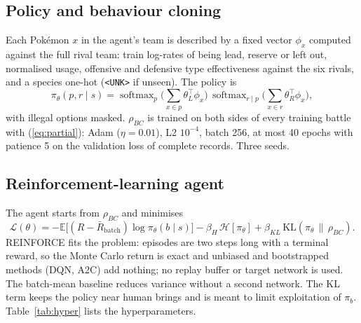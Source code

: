 \documentclass[conference]{IEEEtran}
\begin{document}
\subsection{Policy and behaviour cloning}
Each Pok\'emon $x$ in the agent's team is described by a fixed vector $\phi_x$ computed against the full rival
team: train log-rates of being lead, reserve or left out, normalised usage, offensive and defensive type
effectiveness against the six rivals, and a species one-hot (\texttt{<UNK>} if unseen). The policy is
\begin{equation}
\pi_\theta(p,r\mid s)=\operatorname{softmax}_p\Big(\sum_{x\in p}\theta_L^\top\phi_x\Big)\,
\operatorname{softmax}_{r\mid p}\Big(\sum_{x\in r}\theta_R^\top\phi_x\Big),
\end{equation}
with illegal options masked. $\rho_{BC}$ is trained on both sides of every training battle with
(\ref{eq:partial}): Adam ($\eta=0.01$), L2 $10^{-4}$, batch 256, at most 40 epochs with patience 5 on the
validation loss of complete records. Three seeds.

\subsection{Reinforcement-learning agent}
The agent starts from $\rho_{BC}$ and minimises
\begin{equation}
\mathcal L(\theta)=-\mathbb E\big[(R-\bar R_{\text{batch}})\log\pi_\theta(b\mid s)\big]
-\beta_H\,\mathcal H[\pi_\theta]+\beta_{KL}\,\mathrm{KL}(\pi_\theta\,\|\,\rho_{BC}) .
\end{equation}
REINFORCE fits the problem: episodes are two steps long with a terminal reward, so the Monte Carlo return is
exact and unbiased and bootstrapped methods (DQN, A2C) add nothing; no replay buffer or target network is used.
The batch-mean baseline reduces variance without a second network. The KL term keeps the policy near human
brings and is meant to limit exploitation of $\pi_b$. Table~\ref{tab:hyper} lists the hyperparameters.
\end{document}
